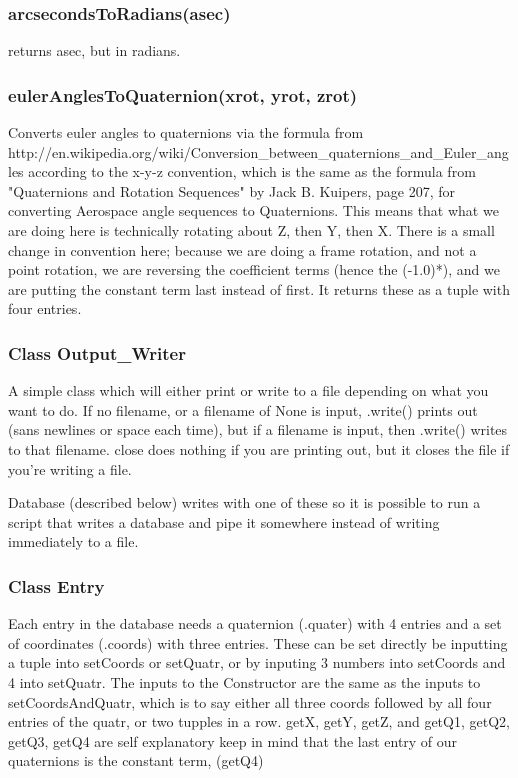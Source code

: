 \subsubsection{arcsecondsToRadians(asec)}
returns asec, but in radians.

\subsubsection{eulerAnglesToQuaternion(xrot, yrot, zrot)}
	Converts euler angles to quaternions via the formula from \newline
http://en.wikipedia.org/wiki/Conversion\_between\_quaternions\_and\_Euler\_angles 
according to the x-y-z convention, which is the same as the formula from 
"Quaternions and Rotation Sequences" by Jack B. Kuipers, page 207, for 
converting Aerospace angle sequences to Quaternions. This means that  what 
we are doing here is technically rotating about Z, then Y, then X. There is 
a small change in convention here; because we are doing a  frame rotation, 
and not a point rotation, we are reversing the coefficient terms (hence the 
(-1.0)*), and we are putting the constant term last instead of first. It 
returns these as a tuple with four entries. 

\subsubsection{Class Output\_Writer}
	A simple class which will either print or write to a file depending 
on what you want to do.  If no filename, or a filename of None is 
input, .write() prints out (sans newlines or space each time), but if a 
filename is input, then .write() writes to that filename. close does 
nothing if you are printing out, but it closes the file if you're writing a 
file.

	Database (described below) writes with one of these so it is 
possible to run a script that writes a database and pipe it somewhere 
instead of writing immediately to a file.

\subsubsection{Class Entry}
	Each entry in the database needs a quaternion (.quater) with 4 
entries and a set of coordinates (.coords) with three entries. These can be 
set directly be inputting a tuple into setCoords or  setQuatr, or by 
inputing 3 numbers into setCoords and 4 into setQuatr. The inputs to the 
Constructor are the same as the inputs to setCoordsAndQuatr, which is to 
say either all three coords followed  by all four entries of the quatr, or 
two tupples in a row.  getX, getY, getZ, and getQ1, getQ2, getQ3, getQ4 are 
self explanatory keep in mind that the last entry of our quaternions is the 
constant term, (getQ4)


